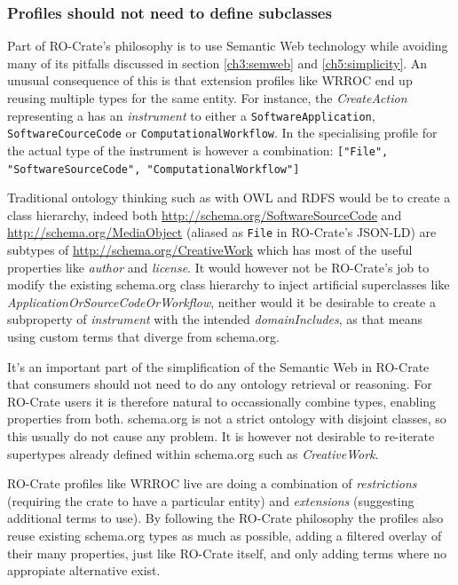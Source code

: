 \subsubsection{Profiles should not need to define subclasses}

Part of RO-Crate's philosophy is to use Semantic Web technology while avoiding many of its pitfalls discussed in section \vref{ch3:semweb} and \vref{ch5:simplicity}. 
An unusual consequence of this is that extension profiles like WRROC end up reusing multiple types for the same entity.  For instance, the \emph{CreateAction} representing a  has an \emph{instrument} to either a \texttt{SoftwareApplication}, \texttt{SoftwareCourceCode} or \texttt{ComputationalWorkflow}. In the specialising profile for  the actual type of the instrument is however a combination: \texttt{["File", "SoftwareSourceCode", "ComputationalWorkflow"]}

Traditional ontology thinking such as with OWL and RDFS would be to create a class hierarchy, indeed both  \url{http://schema.org/SoftwareSourceCode} and \url{http://schema.org/MediaObject} (aliased as \texttt{File} in RO-Crate's JSON-LD) are subtypes of \url{http://schema.org/CreativeWork} which has most of the useful properties like \emph{author} and \emph{license}. It would however not be RO-Crate's job to modify the existing schema.org class hierarchy to inject artificial superclasses like \emph{ApplicationOrSourceCodeOrWorkflow}, neither would it be desirable to create a subproperty of \emph{instrument} with the intended \emph{domainIncludes}, as that means using custom terms that diverge from schema.org. 

It's an important part of the simplification of the Semantic Web in RO-Crate that consumers should not need to do any ontology retrieval or reasoning. For RO-Crate users it is therefore natural to occassionally combine types, enabling properties from both. schema.org is not a strict ontology with disjoint classes, so this usually do not cause any problem. It is however not desirable to re-iterate supertypes already defined within schema.org such as \emph{CreativeWork}. 

RO-Crate profiles like WRROC live are doing a combination of \emph{restrictions} (requiring the crate to have a particular entity) and \emph{extensions} (suggesting additional terms to use). By following the RO-Crate philosophy the profiles also reuse existing schema.org types as much as possible, adding a filtered overlay of their many properties, just like RO-Crate itself, and only adding terms where no appropiate alternative exist.

